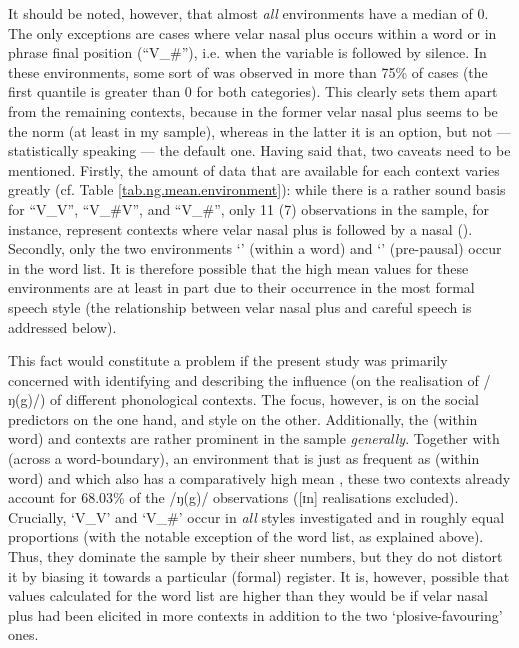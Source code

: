 It should be noted, however, that almost \emph{all} environments have a median  of 0.
The only exceptions are cases where velar nasal plus occurs  within a word or in phrase final position (``V\_\#''), i.e. when the variable is followed by silence.
In these environments, some sort of  was observed in more than 75\% of cases (the first quantile is greater than 0 for both categories).
This clearly sets them apart from the remaining contexts, because in the former velar nasal plus seems to be the norm (at least in my sample), whereas in the latter it is an option, but not --- statistically speaking --- the default one.
Having said that, two caveats need to be mentioned.
Firstly, the amount of data that are available for each context varies greatly (cf. Table \ref{tab.ng.mean.environment}): while there is a rather sound basis for ``V\_V'', ``V\_\#V'', and ``V\_\#'', only 11 (7) observations in the sample, for instance, represent contexts where velar nasal plus is followed by a nasal ().
Secondly, only the two environments `' (within a word) and `' (pre-pausal) occur in the word list.
It is therefore possible that the high mean  values for these environments are at least in part due to their occurrence in the most formal speech style (the relationship between velar nasal plus and careful speech is addressed below).

This fact would constitute a problem if the present study was primarily concerned with identifying and describing the influence (on the realisation of /ŋ(g)/) of different phonological contexts.
The focus, however, is on the social predictors on the one hand, and style on the other.
Additionally, the  (within word) and  contexts are rather prominent in the sample \emph{generally}.
Together with  (across a word-boundary), an environment that is just as frequent as  (within word) and which also has a comparatively high mean , these two contexts  already account for 68.03\% of the /ŋ(g)/ observations ([ɪn] realisations excluded).
Crucially, `V\_V' and `V\_\#' occur in \emph{all} styles investigated and in roughly equal proportions (with the notable exception of the word list, as explained above).
Thus, they dominate the sample by their sheer numbers, but they do not distort it by biasing it towards a particular (formal) register.
It is, however, possible that  values calculated for the word list are higher than they would be if velar nasal plus had been elicited in more contexts in addition to the two `plosive-favouring' ones.

